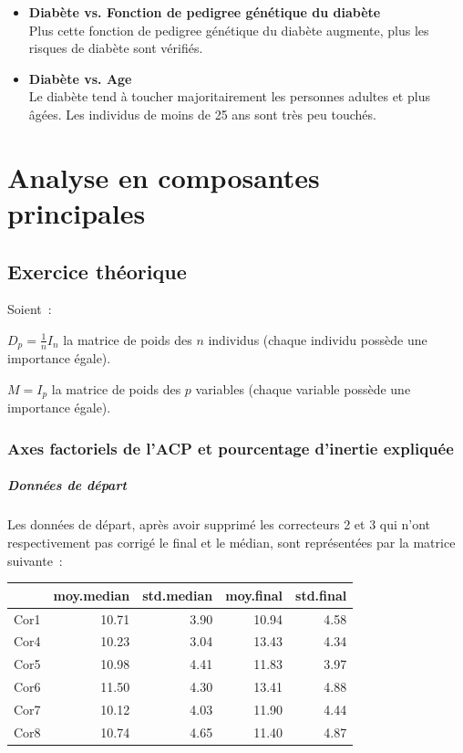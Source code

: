 \documentclass[a4paper,10pt]{report}
\begin{document}
\begin{itemize}
	\item \textbf{Diabète vs. Fonction de pedigree génétique du diabète}
	\\ Plus cette fonction de pedigree génétique du diabète augmente, plus les risques de diabète sont vérifiés.
		
	\item \textbf{Diabète vs. Age}
	\\ Le diabète tend à toucher majoritairement les personnes adultes et plus âgées. Les individus de moins de 25 ans sont très peu touchés.
\end{itemize}




\chapter{Analyse en composantes principales}


\section{Exercice théorique}

Soient~:


$D_p = \frac{1}{n}I_n$ la matrice de poids des $n$ individus (chaque individu possède une importance égale).


$M = I_p$ la matrice de poids des $p$ variables (chaque variable possède une importance égale).


\subsection{Axes factoriels de l'ACP et pourcentage d'inertie expliquée}

\paragraph{Données de départ}
Les données de départ, après avoir supprimé les correcteurs 2 et 3 qui n'ont respectivement pas corrigé le final et le médian, sont représentées par la matrice suivante~:


\begin{table}[H]
	\centering
	\begin{tabular}{r|rrrr}
		& moy.median & std.median & moy.final & std.final \\ 
		\hline
		Cor1 & 10.71 & 3.90 & 10.94 & 4.58 \\ 
		Cor4 & 10.23 & 3.04 & 13.43 & 4.34 \\ 
		Cor5 & 10.98 & 4.41 & 11.83 & 3.97 \\ 
		Cor6 & 11.50 & 4.30 & 13.41 & 4.88 \\ 
		Cor7 & 10.12 & 4.03 & 11.90 & 4.44 \\ 
		Cor8 & 10.74 & 4.65 & 11.40 & 4.87 \\ 
	\end{tabular}
\end{table}
\end{document}

